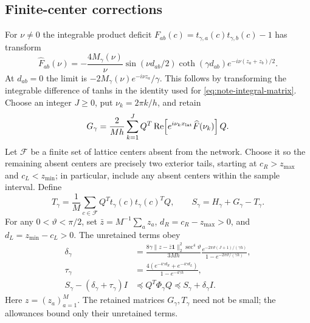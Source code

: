 \subsection{Finite-center corrections}
For $\nu\ne0$ the integrable product deficit
$F_{ab}(c)=t_{\gamma,a}(c)t_{\gamma,b}(c)-1$ has transform
\begin{equation}
 \widehat F_{ab}(\nu)
 =-\frac{4M_\gamma(\nu)}{\nu}
 \sin(\nu d_{ab}/2)\coth(\gamma d_{ab})
 e^{-i\nu(z_a+z_b)/2}.
 \label{eq:note-deficit-transform}
\end{equation}
At $d_{ab}=0$ the limit is $-2M_\gamma(\nu)e^{-i\nu z_a}/\gamma$.
This follows by transforming the integrable difference of tanhs in the
identity used for \eqref{eq:note-integral-matrix}.
Choose an integer $J\ge0$, put $\nu_k=2\pi k/h$, and retain
\begin{equation}
 G_\gamma=\frac2{Mh}\sum_{k=1}^J
 Q^T\operatorname{Re}\!\left[e^{i\nu_k x_{\rm lat}}
 \widehat F(\nu_k)\right]Q.
 \label{eq:note-lattice-correction}
\end{equation}
Let $\mathcal F$ be a finite set of lattice centers absent from the network.
Choose it so the remaining absent centers are precisely two exterior tails,
starting at $c_R>z_{\max}$ and $c_L<z_{\min}$; in particular, include any
absent centers within the sample interval. Define
\begin{equation}
 T_\gamma=\frac1M\sum_{c\in\mathcal F}Q^Tt_\gamma(c)t_\gamma(c)^TQ,
 \qquad S_\gamma=H_\gamma+G_\gamma-T_\gamma.
 \label{eq:note-corrected-matrix}
\end{equation}
For any $0<\vartheta<\pi/2$, set $\bar z=M^{-1}\sum_a z_a$,
$d_R=c_R-z_{\max}>0$, and $d_L=z_{\min}-c_L>0$. The unretained terms obey
\begin{align}
 \delta_\gamma&=
 \frac{8\gamma\|z-\bar z\mathbf1\|_2^2\sec^4\vartheta}{3Mh}
 \frac{e^{-2\pi\vartheta(J+1)/(\gamma h)}}
 {1-e^{-2\pi\vartheta/(\gamma h)}},\label{eq:note-grid-allowance}\\
 \tau_\gamma&=
 \frac{4(e^{-4\gamma d_R}+e^{-4\gamma d_L})}{1-e^{-4\gamma h}},
 \label{eq:note-tail-allowance}\\
 S_\gamma-(\delta_\gamma+\tau_\gamma)I
 &\preceq Q^T\Phi_\gamma Q\preceq S_\gamma+\delta_\gamma I.
 \label{eq:note-matrix-enclosure}
\end{align}
Here $z=(z_a)_{a=1}^M$. The retained matrices $G_\gamma,T_\gamma$
need not be small; the allowances bound only their unretained terms.

